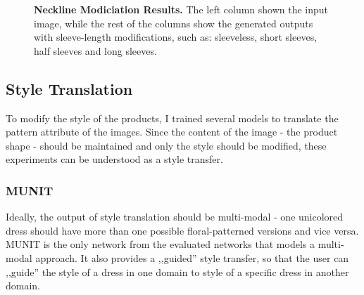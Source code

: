 \documentclass[12pt]{report}
\begin{document}
\begin{figure}[!h]
\centering
{}
\caption{\label{fig:neckline_results} \textbf{Neckline Modiciation Results.} The left column shown the input image, while the rest of the columns show the generated outputs with sleeve-length modifications, such as: sleeveless, short sleeves, half sleeves and long sleeves.}
\end{figure}


\pagebreak
\subsection{Style Translation}
To modify the style of the products, I trained several models to translate the pattern attribute of the images. Since the content of the image - the product shape -  should be maintained and only the style should be modified, these experiments can be understood as a style transfer.

\subsubsection{MUNIT}
Ideally, the output of style translation should be multi-modal - one unicolored dress should have more than one possible floral-patterned versions and vice versa. MUNIT is the only network from the evaluated networks that models a multi-modal approach. It also provides a ,,guided'' style transfer, so that the user can ,,guide'' the style of a dress in one domain to style of a specific dress in another domain.
\end{document}
